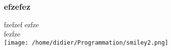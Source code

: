 \documentclass[12pt,a4paper,twoside]{beamer}
\begin{document}
\author{}\\
\title{}
\maketitle
\begin{frame}
\frametitle{efzefez}
\begin{block}{fzefzef}
ezfze\\
fezfze\\
\texttt{[image: /home/didier/Programmation/smiley2.png]}\\ 
\end{block}
\end{frame}
\end{document}
